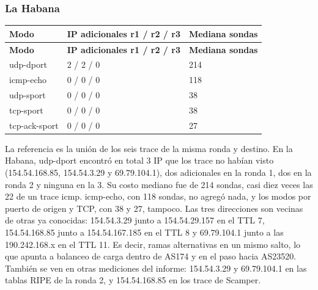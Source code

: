 \subsubsection{La Habana}
\begingroup
\fontsize{9}{11}\selectfont
\addtocounter{table}{-1}
\begin{longtable}{p{3.2cm}p{8cm}p{3cm}}
\toprule
\textbf{Modo} & \textbf{IP adicionales r1 / r2 / r3} & \textbf{Mediana sondas} \\ \midrule
\endfirsthead
\toprule
\textbf{Modo} & \textbf{IP adicionales r1 / r2 / r3} & \textbf{Mediana sondas} \\ \midrule
\endhead
udp-dport & 2 / 2 / 0 & 214 \\
icmp-echo & 0 / 0 / 0 & 118 \\
udp-sport & 0 / 0 / 0 & 38 \\
tcp-sport & 0 / 0 / 0 & 38 \\
tcp-ack-sport & 0 / 0 / 0 & 27 \\
\bottomrule
\end{longtable}
\endgroup

La referencia es la unión de los seis trace de la misma ronda y destino. En la Habana, udp-dport encontró en total 3 IP que los trace no habían visto (154.54.168.85, 154.54.3.29 y 69.79.104.1), dos adicionales en la ronda 1, dos en la ronda 2 y ninguna en la 3. Su costo mediano fue de 214 sondas, casi diez veces las 22 de un trace icmp. icmp-echo, con 118 sondas, no agregó nada, y los modos por puerto de origen y TCP, con 38 y 27, tampoco. Las tres direcciones son vecinas de otras ya conocidas: 154.54.3.29 junto a 154.54.29.157 en el TTL 7, 154.54.168.85 junto a 154.54.167.185 en el TTL 8 y 69.79.104.1 junto a las 190.242.168.x en el TTL 11. Es decir, ramas alternativas en un mismo salto, lo que apunta a balanceo de carga dentro de AS174 y en el paso hacia AS23520. También se ven en otras mediciones del informe: 154.54.3.29 y 69.79.104.1 en las tablas RIPE de la ronda 2, y 154.54.168.85 en los trace de Scamper.


